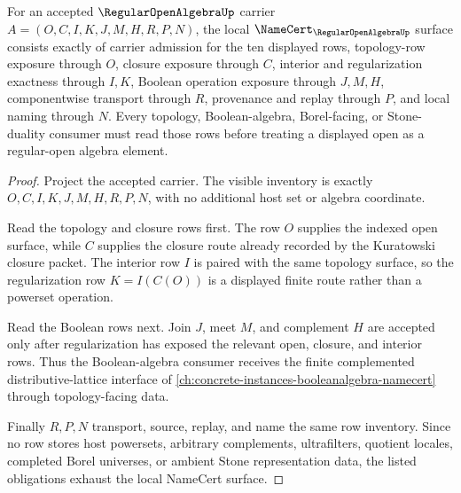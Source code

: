\begin{theorem}
\label{thm:regular-open-algebra-namecert-obligations}
For an accepted $\RegularOpenAlgebraUp$ carrier $A=(O,C,I,K,J,M,H,R,P,N)$, the local $\NameCert_{\RegularOpenAlgebraUp}$ surface consists exactly of carrier admission for the ten displayed rows, topology-row exposure through $O$, closure exposure through $C$, interior and regularization exactness through $I,K$, Boolean operation exposure through $J,M,H$, componentwise transport through $R$, provenance and replay through $P$, and local naming through $N$. Every topology, Boolean-algebra, Borel-facing, or Stone-duality consumer must read those rows before treating a displayed open as a regular-open algebra element.
\end{theorem}
\begin{proof}
Project the accepted carrier. The visible inventory is exactly $O,C,I,K,J,M,H,R,P,N$, with no additional host set or algebra coordinate.

Read the topology and closure rows first. The row $O$ supplies the indexed open surface, while $C$ supplies the closure route already recorded by the Kuratowski closure packet. The interior row $I$ is paired with the same topology surface, so the regularization row $K=I(C(O))$ is a displayed finite route rather than a powerset operation.

Read the Boolean rows next. Join $J$, meet $M$, and complement $H$ are accepted only after regularization has exposed the relevant open, closure, and interior rows. Thus the Boolean-algebra consumer receives the finite complemented distributive-lattice interface of \autoref{ch:concrete-instances-booleanalgebra-namecert} through topology-facing data.

Finally $R,P,N$ transport, source, replay, and name the same row inventory. Since no row stores host powersets, arbitrary complements, ultrafilters, quotient locales, completed Borel universes, or ambient Stone representation data, the listed obligations exhaust the local NameCert surface.
\end{proof}

